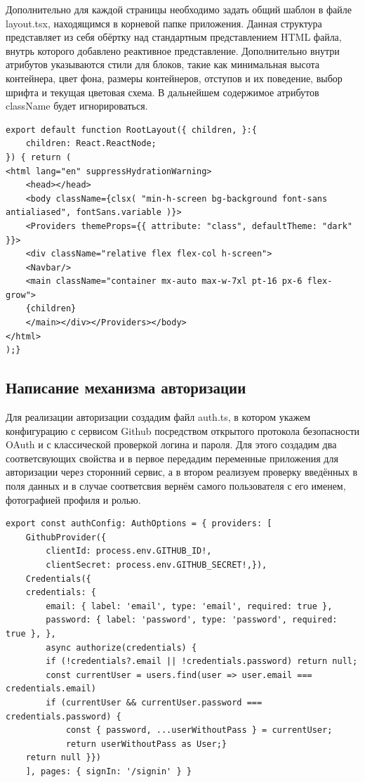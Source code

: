 \documentclass[master, och, diploma]{SCWorks}
\begin{document}
Дополнительно для каждой страницы необходимо задать общий шаблон в файле layout.tsx, находящимся в корневой папке приложения. Данная структура представляет из себя обёртку над стандартным представлением HTML файла, внутрь которого добавлено реактивное представление. Дополнительно внутри атрибутов указываются стили для блоков, такие как минимальная высота контейнера, цвет фона, размеры контейнеров, отступов и их поведение, выбор шрифта и текущая цветовая схема. В дальнейшем содержимое атрибутов className будет  игнорироваться. 
\begin{verbatim}
export default function RootLayout({ children, }:{
	children: React.ReactNode;
}) { return (
<html lang="en" suppressHydrationWarning>  
    <head></head>
    <body className={clsx( "min-h-screen bg-background font-sans antialiased", fontSans.variable )}>
    <Providers themeProps={{ attribute: "class", defaultTheme: "dark" }}>
    <div className="relative flex flex-col h-screen">
    <Navbar/>
    <main className="container mx-auto max-w-7xl pt-16 px-6 flex-grow">
    {children}
    </main></div></Providers></body>
</html>
);}
\end{verbatim}




\subsection{Написание механизма авторизации}
Для реализации авторизации создадим файл auth.ts, в котором укажем конфигурацию с сервисом Github посредством открытого протокола безопасности OAuth и с классической проверкой логина и пароля. Для этого создадим два соответсвующих свойства и в первое передадим переменные приложения для авторизации через сторонний сервис, а в втором реализуем проверку введённых в поля данных и в случае соответсвия вернём самого пользователя с его именем, фотографией профиля и ролью\cite{Fain_2022}.
\begin{verbatim}
export const authConfig: AuthOptions = { providers: [
    GithubProvider({
        clientId: process.env.GITHUB_ID!,
        clientSecret: process.env.GITHUB_SECRET!,}),
    Credentials({
    credentials: {
        email: { label: 'email', type: 'email', required: true },
        password: { label: 'password', type: 'password', required: true }, },
        async authorize(credentials) {
        if (!credentials?.email || !credentials.password) return null;
        const currentUser = users.find(user => user.email === credentials.email)
        if (currentUser && currentUser.password === credentials.password) {
            const { password, ...userWithoutPass } = currentUser;
            return userWithoutPass as User;}
    return null }})
    ], pages: { signIn: '/signin' } }
\end{verbatim}
\end{document}
